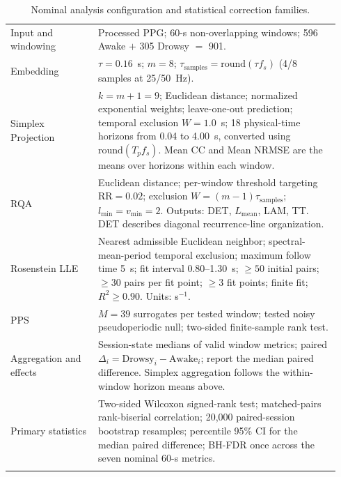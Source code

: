 \begin{table}[p]
\centering
\footnotesize
\setlength{\tabcolsep}{3pt}
\renewcommand{\arraystretch}{1.08}
\caption{Nominal analysis configuration and statistical correction families.}
\label{tab:supp_nominal_config}
\begin{tabular}{>{\raggedright\arraybackslash}p{0.25\linewidth}>{\raggedright\arraybackslash}p{0.69\linewidth}}
\toprule
\multicolumn{2}{l}{\textbf{Panel A. Nominal estimator configuration}} \\
\midrule
Input and windowing & Processed PPG; 60-s non-overlapping windows; 596 Awake $+$ 305 Drowsy $=$ 901. \\
Embedding & $\tau=0.16$~s; $m=8$; $\tau_{\mathrm{samples}}=\mathrm{round}(\tau f_s)$ (4/8 samples at 25/50~Hz). \\
Simplex Projection & $k=m+1=9$; Euclidean distance; normalized exponential weights; leave-one-out prediction; temporal exclusion $W=1.0$~s; 18 physical-time horizons from 0.04 to 4.00~s, converted using $\mathrm{round}(T_p f_s)$. Mean CC and Mean NRMSE are the means over horizons within each window. \\
RQA & Euclidean distance; per-window threshold targeting $\mathrm{RR}=0.02$; exclusion $W=(m-1)\tau_{\mathrm{samples}}$; $l_{\min}=v_{\min}=2$. Outputs: DET, $L_{\mathrm{mean}}$, LAM, TT. DET describes diagonal recurrence-line organization. \\
Rosenstein LLE & Nearest admissible Euclidean neighbor; spectral-mean-period temporal exclusion; maximum follow time 5~s; fit interval 0.80--1.30~s; $\geq50$ initial pairs; $\geq30$ pairs per fit point; $\geq3$ fit points; finite fit; $R^2\geq0.90$. Units: s$^{-1}$. \\
PPS & $M=39$ surrogates per tested window; tested noisy pseudoperiodic null; two-sided finite-sample rank test. \\
Aggregation and effects & Session-state medians of valid window metrics; paired $\Delta_i=\mathrm{Drowsy}_i-\mathrm{Awake}_i$; report the median paired difference. Simplex aggregation follows the within-window horizon means above. \\
Primary statistics & Two-sided Wilcoxon signed-rank test; matched-pairs rank-biserial correlation; 20,000 paired-session bootstrap resamples; percentile 95\% CI for the median paired difference; BH-FDR once across the seven nominal 60-s metrics. \\
\midrule
\multicolumn{2}{l}{\textbf{Panel B. Statistical families}} \\

\end{tabular}
\end{table}
